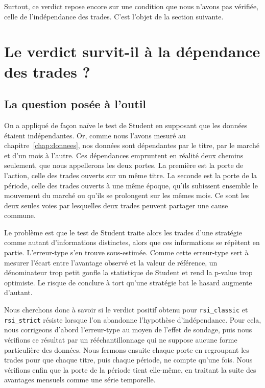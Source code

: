 Surtout, ce verdict repose encore sur une condition que nous n'avons pas
vérifiée, celle de l'indépendance des trades. C'est l'objet de la section
suivante.




\section{Le verdict survit-il à la dépendance des trades ?}
\label{sec:b1-dependance}

\subsection{La question posée à l'outil}
\label{sec:question-dependance}
On a appliqué de façon naïve le test de Student en supposant que
les données étaient indépendantes. Or, comme nous l'avons mesuré
au chapitre~\ref{chap:donnees}, nos données sont dépendantes par le titre,
par le marché et d'un mois à l'autre.
Ces dépendances empruntent en réalité deux chemins seulement, que nous
appellerons les deux portes. La première est la porte de l'action, celle des
trades ouverts sur un même titre. La seconde est la porte de la période,
celle des trades ouverts à une même époque, qu'ils subissent ensemble le
mouvement du marché ou qu'ils se prolongent sur les mêmes mois. Ce sont les
deux seules voies par lesquelles deux trades peuvent partager une cause
commune.

Le problème est que le test de Student traite alors les trades d'une stratégie
comme autant d'informations distinctes, alors que ces informations se
répètent en partie. L'erreur-type s'en trouve sous-estimée. Comme cette
erreur-type sert à mesurer l'écart entre l'avantage observé et la valeur de
référence, un dénominateur trop petit gonfle la statistique de Student et
rend la p-value trop optimiste. Le risque de conclure à tort qu'une stratégie
bat le hasard augmente d'autant.

Nous cherchons donc à savoir si le verdict positif obtenu pour
\texttt{rsi\_classic} et \texttt{rsi\_strict} résiste lorsque l'on abandonne
l'hypothèse d'indépendance. 
Pour cela, nous corrigeons d'abord l'erreur-type
au moyen de l'effet de sondage, puis nous vérifions ce résultat par un
rééchantillonnage qui ne suppose aucune forme particulière des données. Nous
fermons ensuite chaque porte en regroupant les trades pour que chaque titre,
puis chaque période, ne compte qu'une fois. Nous vérifions enfin que la porte
de la période tient elle-même, en traitant la suite des avantages mensuels
comme une série temporelle.

